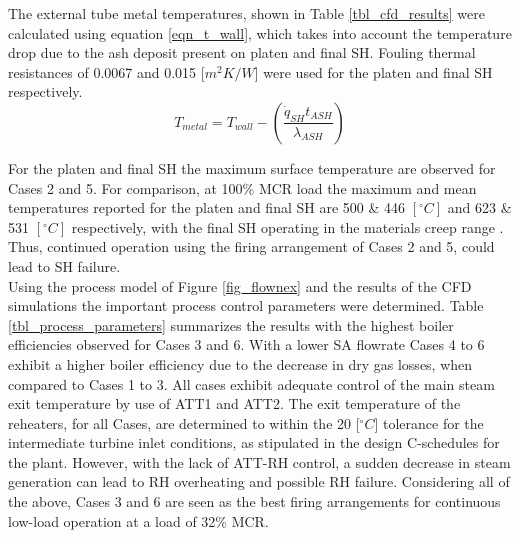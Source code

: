 \documentclass[twocolumn,10pt]{asme2ej}
\begin{document}
The external tube metal temperatures, shown in Table \ref{tbl_cfd_results} were calculated using equation \ref{eqn_t_wall}, which takes into account the temperature drop due to the ash deposit present on platen and final SH. Fouling thermal resistances of 0.0067 and 0.015 [$m^2K/W$] were used for the platen and final SH respectively.
\begin{equation}\label{eqn_t_wall}
T_{metal} = T_{wall} - \left(\frac{\dot{q}_{SH}t_{ASH}}{\lambda_{ASH}}\right)
\end{equation}

For the platen and final SH the maximum surface temperature are observed for Cases 2 and 5. For comparison, at 100\% MCR load the maximum and mean temperatures reported for the platen and final SH are 500 \& 446 $[^\circ C]$ and 623 \& 531 $[^\circ C]$ respectively, with the final SH operating in the materials creep range \cite{Laubscher2019b}. Thus, continued operation using the firing arrangement of Cases 2 and 5, could lead to SH failure.\\
\newpage
Using the process model of Figure \ref{fig_flownex} and the results of the CFD simulations the important process control parameters were determined. Table \ref{tbl_process_parameters} summarizes the results with the highest boiler efficiencies observed for Cases 3 and 6. With a lower SA flowrate Cases 4 to 6 exhibit a higher boiler efficiency due to the decrease in dry gas losses, when compared to Cases 1 to 3. All cases exhibit adequate control of the main steam exit temperature by use of ATT1 and ATT2. The exit temperature of the reheaters, for all Cases, are determined to within the 20 [$^\circ C$] tolerance for the intermediate turbine inlet conditions, as stipulated in the design C-schedules for the plant. However, with the lack of ATT-RH control, a sudden decrease in steam generation can lead to RH overheating and possible RH failure. Considering all of the above, Cases 3 and 6 are seen as the best firing arrangements for continuous low-load operation at a load of 32\% MCR.\\
\end{document}

